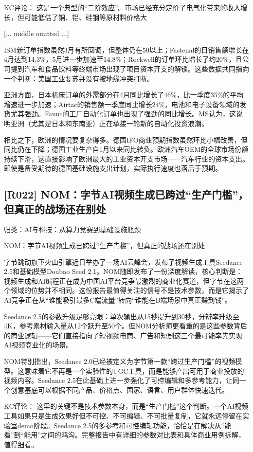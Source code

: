 \documentclass[11pt]{ctexart}
\begin{document}
KC评论： 这是一个典型的“二阶效应”。市场已经充分定价了电气化带来的收入增长，但可能低估了铜、铝、硅钢等原材料价格大

[... middle omitted ...]

ISM新订单指数虽然3月有所回调，但整体仍在50以上；Fastenal的日销售额增长在4月达到14.3\%，5月进一步加速至14.8\%；Rockwell的订单环比增长了约20\%，且公司提到汽车和食品饮料等终端市场出现了项目资本开支的解锁。这些数据共同指向一个判断：美国工业复苏并没有被地缘冲突打断。

亚洲方面，日本机床订单的外需部分在4月同比增长了46\%，比一季度35\%的平均增速进一步加速；Airtac的销售额一季度同比增长24\%，电池和电子设备领域的发货尤其强劲。Fanuc的工厂自动化订单也出现了强劲的同比增长。MS认为，这说明亚洲（尤其是日本和东南亚）正在承接一轮新的自动化投资浪潮。

相比之下，欧洲的情况要复杂得多。德国IFO商业预期指数虽然环比小幅改善，但同比仍在下降；德国工业生产自1月以来同比转负。欧洲汽车OEM的全球市场份额持续下滑，这直接影响了欧洲最大的工业资本开支市场——汽车行业的资本支出。即使是备受期待的德国基础设施支出计划，实际执行速度也落后于预期。

\subsection{[R022] NOM：字节AI视频生成已跨过“生产门槛”，但真正的战场还在别处}
{\small\color{refgray}归类：AI与科技：从算力竞赛到基础设施瓶颈}

NOM：字节AI视频生成已跨过“生产门槛”，但真正的战场还在别处

字节跳动旗下火山引擎近日举办了一场AI云峰会，发布了视频生成工具Seedance 2.5和基础模型Doubao Seed 2.1。NOM随即发布了一份深度解读，核心判断是：视频生成和AI编程正在成为中国AI平台竞争最激烈的商业化赛道，但字节在这两个领域的位势并不相同。这份报告最值得关注的信号不是技术参数，而是它揭示了AI竞争正在从“谁能吸引最多C端流量”转向“谁能在B端场景中真正赚到钱”。

Seedance 2.5的参数升级足够亮眼：单次输出从15秒提升到30秒，分辨率升级至4K，参考素材输入量从12个跃升至50个。但NOM分析师更看重的是这些参数背后的商业逻辑——它们直接指向了短视频电商、广告和短剧这三个最可能率先实现AI视频商业化的场景。

NOM特别指出，Seedance 2.0已经被定义为字节第一款“跨过生产门槛”的视频模型。这意味着它不再是一个实验性的UGC工具，而是能够产出可用于商业投放的视频内容。Seedance 2.5在此基础上进一步强化了可控编辑和多参考能力，让同一个创意基底可以根据不同产品、价格点、国家、语言、用户群体快速迭代。

KC评论： 这里的关键不是技术参数本身，而是“生产门槛”这个判断。一个AI视频工具如果只是生成效果好但不可控、不可编辑、不可批量复制，它就永远停留在实验室demo阶段。Seedance 2.5的多参考和可控编辑功能，恰恰是在解决从“能看”到“能用”之间的鸿沟。完整报告中有详细的参数对比表和具体商业用例拆解，值得细看。
\end{document}
